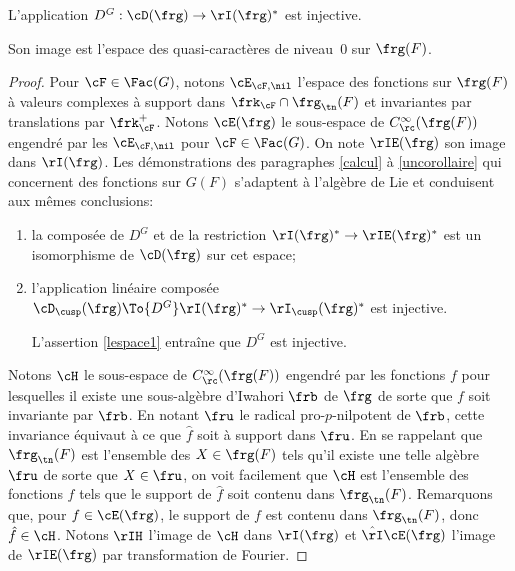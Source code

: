 \skpt
\begin{prop*}
\begin{enumeratei}
\item\label{lespacei}
L'application $D^G:\cD(\frg)\to \rI(\frg)^*$ est injective.

\item\label{lespaceii}
Son image est l'espace des quasi-caractères de niveau~$0$ sur $\frg(F)$.
\end{enumeratei}
\end{prop*}

\begin{proof}
Pour $\cF\in \Fac(G)$, notons $ \cE_{\cF,\nil}$ l'espace des fonctions sur $\frg(F)$ à valeurs complexes à support dans $\frk_{\cF}\cap \frg_{\tn}(F)$ et invariantes par translations par $\frk_{\cF}^+$. Notons $\cE(\frg)$ le sous-espace de $C_{\rc}^{\infty}(\frg(F))$ engendré par les $\cE_{\cF,\nil}$ pour $\cF\in \Fac(G)$. On note $\rIE(\frg)$ son image dans $\rI(\frg)$. Les démonstrations des paragraphes \ref{calcul} à \ref{uncorollaire} qui concernent des fonctions sur $G(F)$ s'adaptent à l'algèbre de Lie et conduisent aux mêmes conclusions:
\begin{enumerate}
\item\label{lespace1}
la composée de $D^G$ et de la restriction $\rI(\frg)^*\to \rIE(\frg)^*$ est un isomorphisme de $\cD(\frg)$ sur cet espace;

\item\label{lespace2}
l'application linéaire composée $\cD_{\cusp}(\frg)\To{D^G}\rI(\frg)^*\to \rI_{\cusp}(\frg)^*$ est injective.

\smallskip\noindent
L'assertion \eqref{lespace1} entraîne que $D^G$ est injective.
\end{enumerate}

Notons $\cH$ le sous-espace de $ C_{\rc}^{\infty}(\frg(F))$ engendré par les fonctions $f$ pour lesquelles il existe une sous-algèbre d'Iwahori $\frb$ de $\frg$ de sorte que $f$ soit invariante par $\frb$. En notant $\fru$ le radical pro-$p$-nilpotent de $\frb$, cette invariance équivaut à ce que $\hat{f}$ soit à support dans $\fru$. En se rappelant que $\frg_{\tn}(F)$ est l'ensemble des $X\in \frg(F)$ tels qu'il existe une telle algèbre $\fru$ de sorte que $X\in \fru$, on voit facilement que $\cH$ est l'ensemble des fonctions $f$ tels que le support de $\hat{f}$ soit contenu dans $\frg_{\tn}(F)$. Remarquons que, pour $f\in \cE(\frg)$, le support de $f$ est contenu dans $\frg_{\tn}(F)$, donc $\hat{f}\in \cH$.
Notons $\rIH$ l'image de $\cH$ dans $\rI(\frg)$ et $\hat{\rI}\cE(\frg)$ l'image de $\rIE(\frg)$ par transformation de Fourier.


\end{proof}
